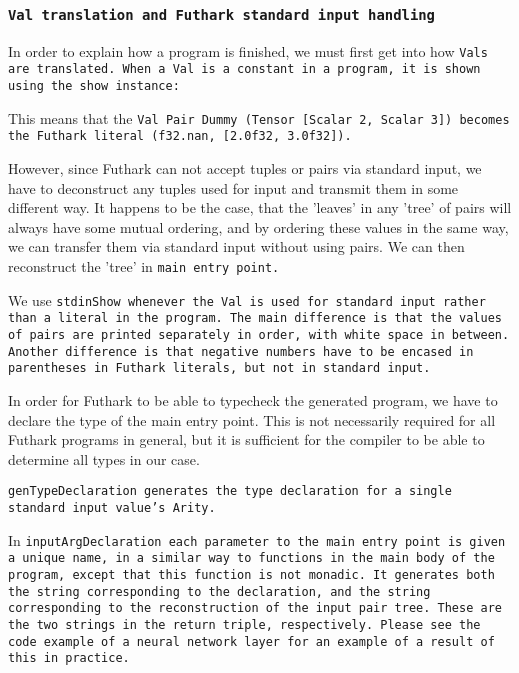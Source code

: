 \subsubsection{\tt{Val} translation and Futhark standard input handling}

In order to explain how a program is finished, we must first get into how
\tt{Val}s are translated. When a \tt{Val} is a constant in a program, it
is shown using the show instance:


This means that the \tt{Val} \tt{Pair Dummy (Tensor [Scalar 2, Scalar 3])}
becomes the Futhark literal \tt{(f32.nan, [2.0f32, 3.0f32])}.

However, since Futhark can not accept tuples or pairs via standard
input, we have to deconstruct any tuples used for input and transmit them in
some different way. It happens to be the case, that the 'leaves' in any
'tree' of pairs will always have some mutual ordering, and by ordering these
values in the same way, we can transfer them via standard input without using
pairs. We can then reconstruct the 'tree' in \tt{main} entry point.


We use \tt{stdinShow} whenever the \tt{Val} is used for standard input
rather than a literal in the program. The main difference is that the values
of pairs are printed separately in order, with white space in between. Another difference is that negative numbers have to be encased in parentheses in Futhark literals, but not in standard input.

In order for Futhark to be able to typecheck the generated program, we have
to declare the type of the main entry point. This is not necessarily required
for all Futhark programs in general, but it is sufficient for the compiler to
be able to determine all types in our case.


\tt{genTypeDeclaration} generates the type declaration for a single
standard input value's \tt{Arity}.


In \tt{inputArgDeclaration} each parameter to the \tt{main} entry point is
given a unique name, in a similar way to functions in the main body of the
program, except that this function is not monadic. It generates both the
string corresponding to the declaration, and the string corresponding to the
reconstruction of the input pair tree. These are the two strings in the
return triple, respectively. Please see the code example of a neural network
layer for an example of a result of this in practice.

